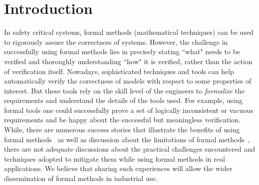 \section{Introduction}
\label{sec:intro}

 
In safety critical systems, formal methods (mathematical techniques) can be used to rigorously assure the correctness of systems. However, the challenge in successfully using formal methods lies in precisely stating ``what" needs to be verified and thoroughly understanding ``how" it is verified, rather than the action of verification itself. Nowadays, sophisticated techniques and tools can help automatically verify the correctness of models with respect to some properties of interest.  But these tools rely on the skill level of the engineers to \emph{formalize} the requirements and understand the details of the tools used. For example, using formal tools one could successfully prove a set of logically inconsistent or vacuous requirements and be happy about the successful but meaningless verification. While, there are numerous success stories that illustrate the benefits of using formal methods~\cite{Miller03:shalls,Whalen07:FMICS} as well as discussion about the limitations of formal methods~\cite{kneuper1997limits,hall1990seven}, there are not adequate discussions about the practical challenges encountered and techniques adopted to mitigate them while using formal methods in real applications. We believe that sharing such experiences will allow the wider dissemination of formal methods in industrial use.

